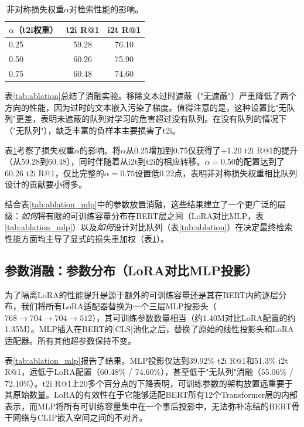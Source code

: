 \documentclass[10pt,a4paper]{ctexart}
\begin{document}
\begin{table}[h]
\centering
\begin{tabular}{lcc}
\toprule
$\alpha$（t2i权重） & t2i R@1 & i2t R@1 \\
\midrule
0.25 & 59.28 & 76.10 \\
0.50 & 60.26 & 75.90 \\
0.75 & 60.48 & 74.60 \\
\bottomrule
\end{tabular}
\caption{非对称损失权重$\alpha$对检索性能的影响。}
\label{tab:alpha}
\end{table}

表\ref{tab:ablation}总结了消融实验。移除文本过时遮蔽（"无遮蔽"）严重降低了两个方向的性能，因为过时的文本嵌入污染了梯度。值得注意的是，这种设置比"无队列"更差，表明未遮蔽的队列对学习的危害超过没有队列。在没有队列的情况下（"无队列"），缺乏丰富的负样本主要损害了t2i。

表\ref{tab:alpha}考察了损失权重$\alpha$的影响。将$\alpha$从0.25增加到0.75仅获得了+1.20 t2i R@1的提升（从59.28到60.48），同时伴随着从i2t到t2i的相应转移。$\alpha{=}0.50$的配置达到了60.26 t2i R@1，仅比完整的$\alpha{=}0.75$设置低0.22点，表明非对称损失权重相比队列设计的贡献要小得多。

结合表\ref{tab:ablation_mlp}中的参数放置消融，这些结果建立了一个更广泛的层级：\emph{如何}将有限的可训练容量分布在BERT层之间（LoRA对比MLP，表\ref{tab:ablation_mlp}）以及\emph{如何}设计对比队列（表\ref{tab:ablation}）在决定最终检索性能方面均主导了显式的损失重加权（表\ref{tab:alpha}）。

\subsection{参数消融：参数分布（LoRA对比MLP投影）}

为了隔离LoRA的性能提升是源于额外的可训练容量还是其在BERT内的逐层分布，我们将所有LoRA适配器替换为一个三层MLP投影头（$768 \to 704 \to 704 \to 512$），其可训练参数数量相当（约1.40M对比LoRA配置的约1.35M）。MLP插入在BERT的[CLS]池化之后，替换了原始的线性投影头和LoRA适配器。所有其他超参数保持不变。

表\ref{tab:ablation_mlp}报告了结果。MLP投影仅达到39.92\% t2i R@1和51.3\% i2t R@1，远低于LoRA配置（60.48\% / 74.60\%），甚至低于"无队列"消融（55.06\% / 72.10\%）。t2i R@1上20多个百分点的下降表明，可训练参数的架构放置远重要于其原始数量。LoRA的有效性在于它能够适配BERT所有12个Transformer层的内部表示，而MLP将所有可训练容量集中在一个事后投影中，无法弥补冻结的BERT骨干网络与CLIP嵌入空间之间的不对齐。
\end{document}
